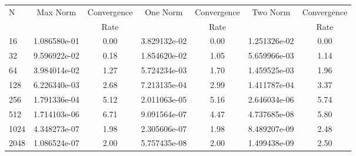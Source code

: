 \documentclass[12pt]{article}
\begin{document}
	\begin{tabular}{l|c|c|c|c|c|c}
		N&Max Norm&Convergence&One Norm&Convergence&Two Norm&Convergence\\
		&&Rate&&Rate&&Rate\\
		\hline
		16&1.086580e-01&0.00&3.829132e-02&0.00&1.251326e-02&0.00\\
		\hline
		32&9.596922e-02&0.18&1.854620e-02&1.05&5.659966e-03&1.14\\
		\hline
		64&3.984014e-02&1.27&5.724234e-03&1.70&1.459525e-03&1.96\\
		\hline
		128&6.226340e-03&2.68&7.213135e-04&2.99&1.411787e-04&3.37\\
		\hline
		256&1.791336e-04&5.12&2.011063e-05&5.16&2.646034e-06&5.74\\
		\hline
		512&1.714103e-06&6.71&9.091564e-07&4.47&4.737685e-08&5.80\\
		\hline
		1024&4.348273e-07&1.98&2.305606e-07&1.98&8.489207e-09&2.48\\
		\hline
		2048&1.086524e-07&2.00&5.757435e-08&2.00&1.499438e-09&2.50\\
	\end{tabular}
\end{document}
